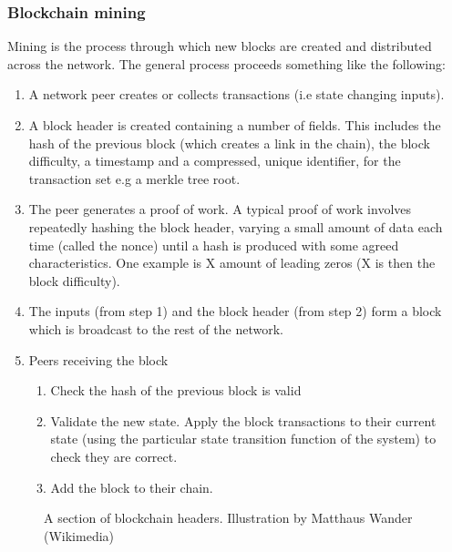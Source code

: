 \subsubsection{Blockchain mining}
Mining is the process through which new blocks are created and distributed across the network. The general process proceeds something like the following:
\begin{enumerate}

\item A network peer creates or collects transactions (i.e state changing inputs).


\item A block header is created containing a number of fields. This includes the hash of the previous block (which creates a link in the chain), the block difficulty, a timestamp and a compressed, unique identifier, for the transaction set e.g a merkle\cite{Merkle} tree root.


\item The peer generates a proof of work. A typical proof of work involves repeatedly hashing\cite{Hash} the block header, varying a small amount of data each time (called the nonce) until a hash is produced with some agreed characteristics. One example is X amount of leading zeros (X is then the block difficulty).


\item The inputs (from step 1) and the block header (from step 2) form a block which is broadcast to the rest of the network. 


\item Peers receiving the block 

\begin{enumerate}
\item Check the hash of the previous block is valid

\item Validate the new state. Apply the block transactions to their current state (using the particular state transition function of the system) to check they are correct.

\item Add the block to their chain.
\end{enumerate}
\end{enumerate}

\begin{figure}
\centering
{}
\decoRule
\caption[Sequence of Blockchain Headers]{A section of blockchain headers. Illustration by Matthaus Wander (Wikimedia) \cite{blockchainHeaders}}
\label{fig:bitcoin_transition}
\end{figure}

